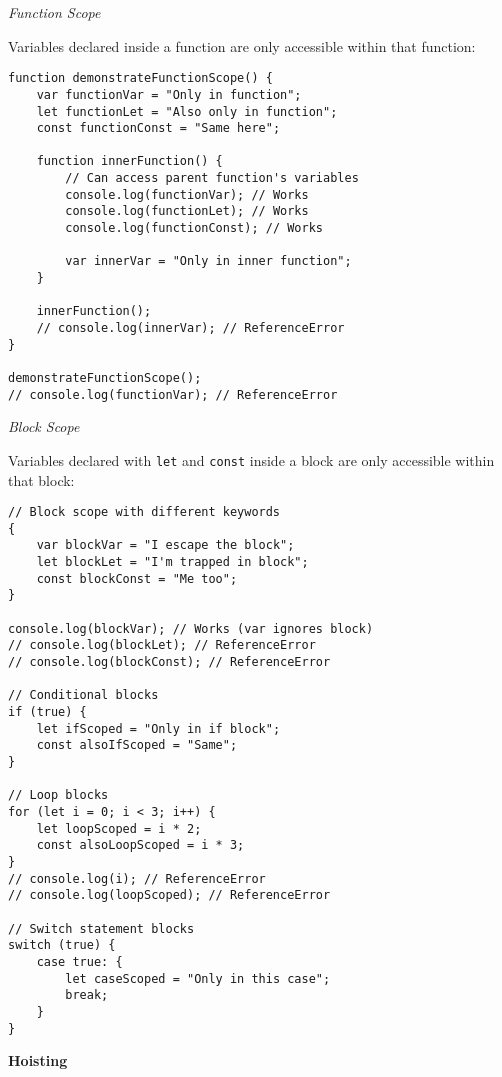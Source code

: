 \documentclass[12pt,a4paper,oneside]{book}
\newcommand{\mysubsection}[1]{%
    \vspace{0.2em}
    {\normalsize\bfseries #1}
    \vspace{0.1em}
    \addcontentsline{toc}{subsection}{#1}
}
\newcommand{\mysubsubsection}[1]{%
    \vspace{0.1em}
    {\normalsize\itshape #1}
    \vspace{0.1em}
}
\begin{document}
\mysubsubsection{Function Scope}

Variables declared inside a function are only accessible within that function:

\begin{lstlisting}[style=javascript, caption={\textbf{Function Scope}}, label=lst:function-scope]
function demonstrateFunctionScope() {
    var functionVar = "Only in function";
    let functionLet = "Also only in function";
    const functionConst = "Same here";
    
    function innerFunction() {
        // Can access parent function's variables
        console.log(functionVar); // Works
        console.log(functionLet); // Works
        console.log(functionConst); // Works
        
        var innerVar = "Only in inner function";
    }
    
    innerFunction();
    // console.log(innerVar); // ReferenceError
}

demonstrateFunctionScope();
// console.log(functionVar); // ReferenceError
\end{lstlisting}

\mysubsubsection{Block Scope}

Variables declared with \texttt{let} and \texttt{const} inside a block are only accessible within that block:

\begin{lstlisting}[style=javascript, caption={\textbf{Block Scope}}, label=lst:block-scope]
// Block scope with different keywords
{
    var blockVar = "I escape the block";
    let blockLet = "I'm trapped in block";
    const blockConst = "Me too";
}

console.log(blockVar); // Works (var ignores block)
// console.log(blockLet); // ReferenceError
// console.log(blockConst); // ReferenceError

// Conditional blocks
if (true) {
    let ifScoped = "Only in if block";
    const alsoIfScoped = "Same";
}

// Loop blocks
for (let i = 0; i < 3; i++) {
    let loopScoped = i * 2;
    const alsoLoopScoped = i * 3;
}
// console.log(i); // ReferenceError
// console.log(loopScoped); // ReferenceError

// Switch statement blocks
switch (true) {
    case true: {
        let caseScoped = "Only in this case";
        break;
    }
}
\end{lstlisting}

\mysubsection{Hoisting}
\end{document}
